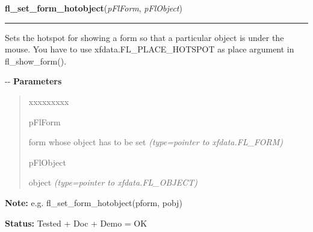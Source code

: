     \vspace{0.5ex}

\hspace{.8\funcindent}\begin{boxedminipage}{\funcwidth}

    \raggedright \textbf{fl\_set\_form\_hotobject}(\textit{pFlForm}, \textit{pFlObject})

    \vspace{-1.5ex}

    \rule{\textwidth}{0.5\fboxrule}
\setlength{\parskip}{2ex}

Sets the hotspot for showing a form so that a particular object is
under the mouse. You have to use xfdata.FL\_PLACE\_HOTSPOT as place
argument in fl\_show\_form().

-{}-
\setlength{\parskip}{1ex}
      \textbf{Parameters}
      \vspace{-1ex}

      \begin{quote}
        \begin{Ventry}{xxxxxxxxx}

          \item[pFlForm]


form whose object has to be set
            {\it (type=pointer to xfdata.FL\_FORM)}

          \item[pFlObject]


object
            {\it (type=pointer to xfdata.FL\_OBJECT)}

        \end{Ventry}

      \end{quote}

\textbf{Note:} 
e.g. fl\_set\_form\_hotobject(pform, pobj)


\textbf{Status:} 
Tested + Doc + Demo = OK


    \end{boxedminipage}

    \label{xformslib:flbasic:fl_set_form_minsize}

    \vspace{0.5ex}

